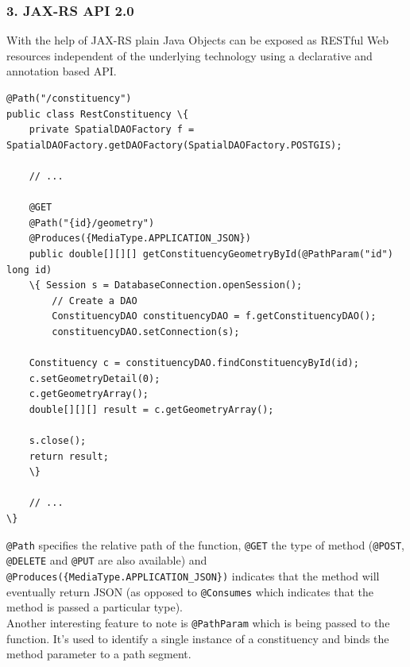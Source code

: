 \subsubsection{3. JAX-RS API 2.0}\label{jax-rs-api-2.0}

With the help of JAX-RS plain Java Objects can be exposed as RESTful Web
resources independent of the underlying technology using a declarative
and annotation based API.

\begin{lstlisting}
@Path("/constituency")
public class RestConstituency \{
    private SpatialDAOFactory f = SpatialDAOFactory.getDAOFactory(SpatialDAOFactory.POSTGIS);

	// ...
	
    @GET
    @Path("{id}/geometry")
    @Produces({MediaType.APPLICATION_JSON})
    public double[][][] getConstituencyGeometryById(@PathParam("id") long id)
    \{ Session s = DatabaseConnection.openSession();
        // Create a DAO
        ConstituencyDAO constituencyDAO = f.getConstituencyDAO();
        constituencyDAO.setConnection(s);

	Constituency c = constituencyDAO.findConstituencyById(id);
	c.setGeometryDetail(0);
	c.getGeometryArray();
	double[][][] result = c.getGeometryArray();
		
	s.close();
	return result;
    \}
    
	// ...
\}
\end{lstlisting}

\texttt{@Path} specifies the relative path of the function,
\texttt{@GET} the type of method (\texttt{@POST}, \texttt{@DELETE} and
\texttt{@PUT} are also available) and
\texttt{@Produces(\{MediaType.APPLICATION\_JSON\})} indicates that the
method will eventually return JSON (as opposed to \texttt{@Consumes}
which indicates that the method is passed a particular type).\\Another
interesting feature to note is \texttt{@PathParam} which is being passed
to the function. It's used to identify a single instance of a
constituency and binds the method parameter to a path segment.